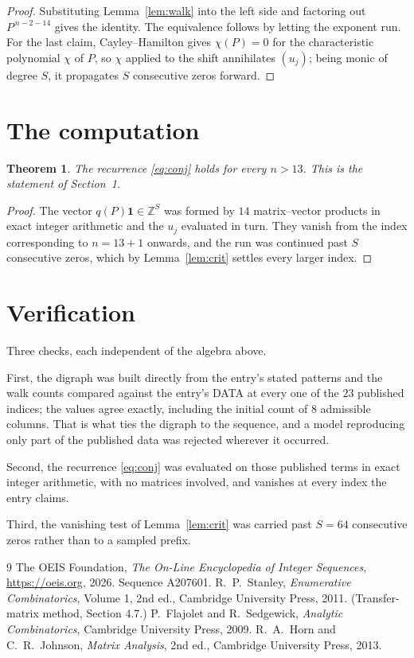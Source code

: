 \documentclass[11pt,a4paper]{article}
\theoremstyle{plain}
\newtheorem{theorem}{Theorem}
\theoremstyle{definition}
\begin{document}
\begin{proof}
Substituting Lemma~\ref{lem:walk} into the left side and factoring out
$P^{\,n-2-14}$ gives the identity. The equivalence follows by letting the exponent
run. For the last claim, Cayley--Hamilton gives $\chi(P)=0$ for the characteristic
polynomial $\chi$ of $P$, so $\chi$ applied to the shift annihilates $(u_j)$; being monic of
degree $S$, it propagates $S$ consecutive zeros forward.
\end{proof}

\section{The computation}

\begin{theorem}
The recurrence \eqref{eq:conj} holds for every $n>13$. This is the statement of
Section~1.
\end{theorem}

\begin{proof}
The vector $q(P)\mathbf{1}\in\mathbb{Z}^{S}$ was formed by $14$ matrix--vector
products in exact integer arithmetic and the $u_j$ evaluated in turn. They vanish from the
index corresponding to $n=13+1$ onwards, and the run was continued past $S$ consecutive
zeros, which by Lemma~\ref{lem:crit} settles every larger index.
\end{proof}

\section{Verification}

Three checks, each independent of the algebra above.

First, the digraph was built directly from the entry's stated patterns and the walk counts
compared against the entry's DATA at every one of the $23$ published indices; the
values agree exactly, including the initial count of $8$ admissible columns. That is
what ties the digraph to the sequence, and a model reproducing only part of the published
data was rejected wherever it occurred.

Second, the recurrence \eqref{eq:conj} was evaluated on those published terms in exact
integer arithmetic, with no matrices involved, and vanishes at every index the entry claims.

Third, the vanishing test of Lemma~\ref{lem:crit} was carried past $S=64$ consecutive
zeros rather than to a sampled prefix.

\begin{thebibliography}{9}
 The OEIS Foundation, \emph{The On-Line Encyclopedia of Integer
Sequences}, \url{https://oeis.org}, 2026. Sequence A207601.
 R.~P.~Stanley, \emph{Enumerative Combinatorics}, Volume 1, 2nd ed.,
Cambridge University Press, 2011. (Transfer-matrix method, Section 4.7.)
 P.~Flajolet and R.~Sedgewick, \emph{Analytic Combinatorics}, Cambridge
University Press, 2009.
 R.~A.~Horn and C.~R.~Johnson, \emph{Matrix Analysis}, 2nd ed., Cambridge
University Press, 2013.
\end{thebibliography}
\end{document}
